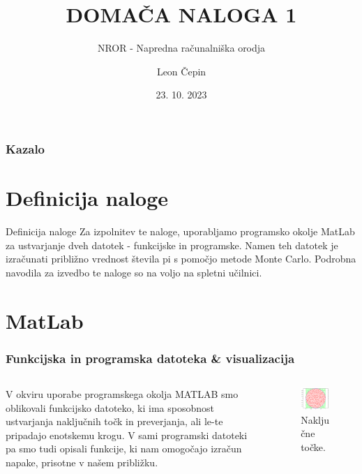 \documentclass{beamer}
\title{DOMAČA NALOGA 1}
\subtitle{NROR - Napredna računalniška orodja}
\author{Leon Čepin}
\institute{UL, Fakulteta za strojništvo}
\date{23. 10. 2023}
\begin{document}
\frame{\titlepage}

\begin{frame}
    \frametitle{Kazalo}
    \tableofcontents
\end{frame}

\section{Definicija naloge}
\begin{frame}{Definicija naloge}
    Za izpolnitev te naloge, uporabljamo programsko okolje MatLab za ustvarjanje dveh datotek - funkcijske in programske. Namen teh datotek je izračunati približno vrednost števila pi s pomočjo metode Monte Carlo. Podrobna navodila za izvedbo te naloge so na voljo na spletni učilnici.
\end{frame}

\section{MatLab}
\begin{frame}
\frametitle{Funkcijska in programska datoteka \& visualizacija}
\begin{columns}
\begin{column}{0.5\textwidth}
\justifying
V okviru uporabe programskega okolja MATLAB smo oblikovali funkcijsko datoteko, ki ima sposobnost ustvarjanja naključnih točk in preverjanja, ali le-te pripadajo enotskemu krogu. V sami programski datoteki pa smo tudi opisali funkcije, ki nam omogočajo izračun napake, prisotne v našem približku.
\end{column}
\begin{column}{0.5\textwidth}
    \begin{figure}
    \centering
        \includegraphics[width=1\textwidth]{graf.png}
        \caption{Naključne točke.}
    \end{figure}
\end{column}
\end{columns}
\end{frame}
\end{document}
